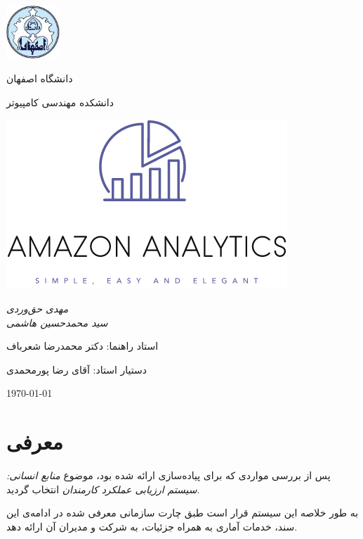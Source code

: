 \documentclass[11pt, oneside]{book}
\newcommand{\amz}{\lr{Amazon} }
\begin{document}
\frontmatter
\begin{titlepage}
    \centering
    \includegraphics[width=2cm, height=2cm]{../images/logo}\par
    \vspace{2mm}            دانشگاه اصفهان \par
    دانشکده مهندسی کامپیوتر \par
    
    \vspace{1cm}
    \includegraphics{../images/alogo} \par
    \vspace{3cm}
    {\small\itshape                مهدی حق‌وردی\\
        سید محمدحسین هاشمی \par}
    
    \vfill \par	\vfill
    
    \vfill            استاد راهنما:‌ دکتر محمدرضا شعرباف \par
    دستیار استاد:‌ آقای رضا پورمحمدی
    \vfill
    
    {\large \today}
\end{titlepage}
\tableofcontents
\mainmatter

\chapter{معرفی}
    پس از بررسی مواردی که برای پیاده‌سازی ارائه شده بود، موضوع \textit{منابع انسانی:‌ سیستم ارزیابی عملکرد کارمندان} انتخاب گردید.
    
    به طور خلاصه این سیستم قرار است طبق چارت سازمانی معرفی شده در ادامه‌ی این سند، خدمات آماری به همراه جزئیات، به شرکت \amz و مدیران آن ارائه دهد. 
    
\end{document}
